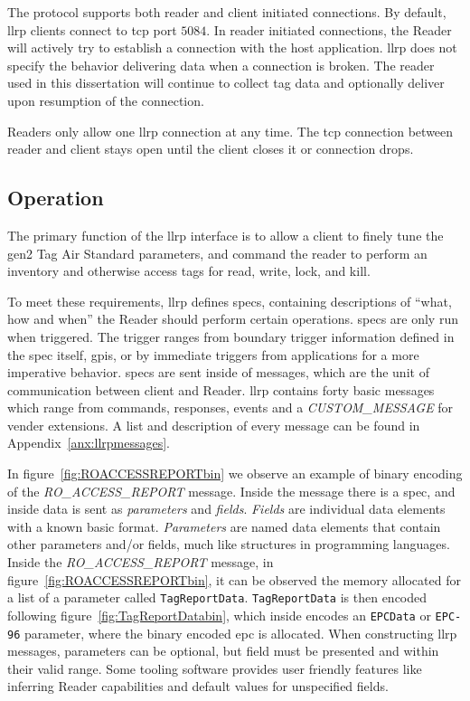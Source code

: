 The protocol supports both reader and client initiated connections. By default, \ac{llrp} clients connect to \acs{tcp} port $5084$. In reader initiated connections, the Reader will actively try to establish a connection with the host application.
\ac{llrp} does not specify the behavior delivering data when a connection is broken. The reader used in this dissertation will continue to collect tag data and optionally deliver upon resumption of the connection.

Readers only allow one \ac{llrp} connection at any time. The \ac{tcp} connection between reader and client stays open until the client closes it or connection drops.

\subsection{Operation}

The primary function of the \ac{llrp} interface is to allow a client to finely tune the \ac{gen2} Tag Air Standard parameters, and command the reader to perform an inventory and otherwise access tags for read, write, lock, and kill.

To meet these requirements, \ac{llrp} defines \acp{spec}, containing descriptions of ``what, how and when'' the Reader should perform certain operations.
\acp{spec} are only run when triggered. The trigger ranges from boundary trigger information defined in the \ac{spec} itself, \acp{gpi}, or by immediate triggers from applications for a more imperative behavior.
\acp{spec} are sent inside of messages, which are the unit of communication between client and Reader.
\ac{llrp} contains forty basic messages which range from commands, responses, events and a \textit{CUSTOM\_MESSAGE} for vender extensions. A list and description of every message can be found in Appendix~\ref{anx:llrpmessages}.

In figure~\ref{fig:ROACCESSREPORTbin} we observe an example of binary encoding of the \textit{RO\_ACCESS\_REPORT} message.
Inside the message there is a \ac{spec}, and inside data is sent as \emph{parameters} and \emph{fields}.
\emph{Fields} are individual data elements with a known basic format.
\emph{Parameters} are named data elements that contain other parameters and/or fields, much like structures in programming languages.
Inside the \textit{RO\_ACCESS\_REPORT} message, in figure~\ref{fig:ROACCESSREPORTbin}, it can be observed the memory allocated for a list of a parameter called \texttt{TagReportData}. \texttt{TagReportData} is then encoded following figure~\ref{fig:TagReportDatabin}, which inside encodes an \texttt{EPCData} or \texttt{EPC-96} parameter, where the binary encoded \ac{epc} is allocated.
When constructing \ac{llrp} messages, parameters can be optional, but field must be presented and within their valid range. Some tooling software provides user friendly features like inferring Reader capabilities and default values for unspecified fields.

